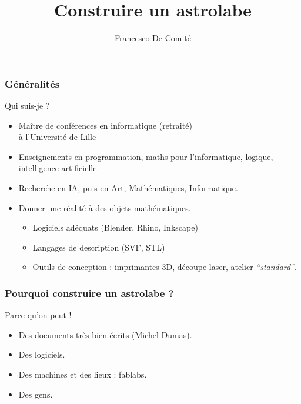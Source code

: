 \documentclass{beamer}
\title[Construire un astrolabe]{Construire un astrolabe}
\author{Francesco De Comité}\institute{Ex-Université de Lille \\ Faculté des Sciences et Technologies}
\begin{document}
 \begin{frame}
\titlepage
{}
   \end{frame}

  
 \begin{frame}\frametitle{Généralités}

\begin{block}{Qui suis-je ? }
\begin{itemize}
\item Maître de conférences en informatique (retraité) \\ à l'Université de Lille
\item Enseignements en programmation, maths pour l'informatique, logique, intelligence artificielle. 
\item Recherche en IA, puis en Art, Mathématiques, Informatique. 
\item \begin{block}{Donner une réalité à des objets mathématiques. }
	\begin{itemize}
	\item Logiciels adéquats (Blender, Rhino, Inkscape)
	\item Langages de description (SVF, STL)
	\item Outils de conception : imprimantes 3D, découpe laser, atelier {\it ``standard''}.
	\end{itemize}
	\end{block}
\end{itemize}
\end{block}

   \end{frame}


  
 \begin{frame}\frametitle{Pourquoi construire un astrolabe ?}
 
 \begin{block}{Parce qu'on peut !}
 \begin{itemize}
 \item Des documents très bien écrits (Michel Dumas).
 \item Des logiciels.
 \item Des machines et des lieux : fablabs. 
 \item Des gens. 
 \end{itemize}
 
 
 
 \end{block}
 
\end{frame}
\end{document}
